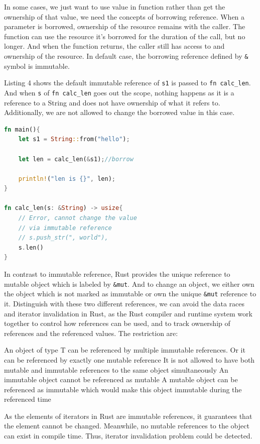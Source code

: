 \documentclass[10pt,a4paper,twocolumn]{article}
\newcommand{\code}[1]{\colorbox{light-gray}{\texttt{#1}}}
\begin{document}
In some cases, we just want to use value in function rather than get the ownership of that value, we need the concepts of borrowing reference. When a parameter is borrowed, ownership of the resource remains with the caller. The function can use the resource it’s borrowed for the duration of the call, but no longer. And when the function returns, the caller still has access to and ownership of the resource. In default case, the borrowing reference defined by \lstinline{&} symbol is immutable.

Listing 4 shows the default immutable reference of \code{s1} is passed to \lstinline{fn calc_len}. And when \code{s} of \lstinline{fn calc_len} goes out the scope, nothing happens as it is a reference to a String and does not have ownership of what it refers to. Additionally, we are not allowed to change the borrowed value in this case.
\begin{lstlisting}[language=Rust, style=boxed, caption={Borrowing Reference}]
fn main(){
    let s1 = String::from("hello");

    let len = calc_len(&s1);//borrow

    println!("len is {}", len);
}

fn calc_len(s: &String) -> usize{
    // Error, cannot change the value 
    // via immutable reference
    // s.push_str(", world"),
    s.len()
}
\end{lstlisting}

In contrast to immutable reference, Rust provides the unique reference to mutable object which is labeled by \lstinline{&mut}. And to change an object, we either own the object which is not marked as immutable or own the unique \lstinline{&mut} reference to it. Distinguish with these two different references, we can avoid the data races and iterator invalidation in Rust, as the Rust compiler and runtime system work together to control how references can be used, and to track ownership of references and the referenced values. The restriction are:
\begin{outline}
    \1 An object of type T can be referenced by multiple immutable references. Or it can be referenced by exactly one mutable reference
    \1 It is not allowed to have both mutable and immutable references to the same object simultaneously
    \1 An immutable object cannot be referenced as mutable
    \1 A mutable object can be referenced as immutable which would make this object immutable during the referenced time
\end{outline}
As the elements of iterators in Rust are immutable references, it guarantees that the element cannot be changed. Meanwhile, no mutable references to the object can exist in compile time. Thus, iterator invalidation problem could be detected.
\end{document}
